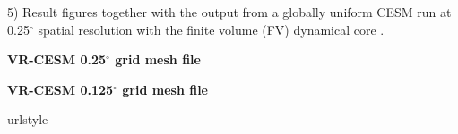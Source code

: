 \documentclass[ms]{agutexSI}
\begin{document}
\begin{article}
5) Result figures together with the output from a globally uniform CESM run at 0.25$^\circ$ spatial resolution with the finite volume (FV) dynamical core \citep{wehner2014effect}.


\clearpage

%


\noindent\textbf{VR-CESM 0.25$^\circ$ grid mesh file} 

\noindent\textbf{VR-CESM 0.125$^\circ$ grid mesh file} 





%
%


%
\begin{thebibliography}{1}
\providecommand{\natexlab}[1]{#1}
\expandafter\ifx\csname urlstyle\endcsname\relax
  \providecommand{\doi}[1]{doi:\discretionary{}{}{}#1}\else
  \providecommand{\doi}{doi:\discretionary{}{}{}\begingroup
  \urlstyle{rm}\Url}\fi
  

\end{thebibliography}
\end{article}
\end{document}
